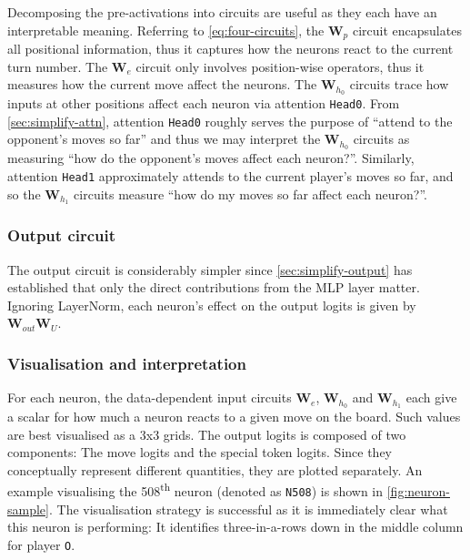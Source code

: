 \documentclass{article}
\newcommand{\m}[1]{\mathbf{\bm{#1}}}
\newcounter{num}
\begin{document}
Decomposing the pre-activations into circuits are useful as they each have an interpretable meaning. Referring to \cref{eq:four-circuits}, the $\m{W}_p$ circuit encapsulates all positional information, thus it captures how the neurons react to the current turn number. The $\m{W}_e$ circuit only involves position-wise operators, thus it measures how the current move affect the neurons. The $\m{W}_{h_0}$ circuits trace how inputs at other positions affect each neuron via attention \texttt{Head0}. From \cref{sec:simplify-attn}, attention \texttt{Head0} roughly serves the purpose of ``attend to the opponent's moves so far'' and thus we may interpret the $\m{W}_{h_0}$ circuits as measuring ``how do the opponent's moves affect each neuron?''. Similarly, attention \texttt{Head1} approximately attends to the current player's moves so far, and so the $\m{W}_{h_1}$ circuits measure ``how do my moves so far affect each neuron?''.

\subsubsection{Output circuit}

The output circuit is considerably simpler since \cref{sec:simplify-output} has established that only the direct contributions from the MLP layer matter. Ignoring LayerNorm, each neuron's effect on the output logits is given by $\m{W}_{out} \m{W}_U$.

\subsubsection{Visualisation and interpretation}



For each neuron, the data-dependent input circuits $\m{W}_e$, $\m{W}_{h_0}$ and $\m{W}_{h_1}$ each give a scalar for how much a neuron reacts to a given move on the board. Such values are best visualised as a 3x3 grids. The output logits is composed of two components: The move logits and the special token logits. Since they conceptually represent different quantities, they are plotted separately. An example visualising the 508\textsuperscript{th} neuron (denoted as \texttt{N508}) is shown in \cref{fig:neuron-sample}. The visualisation strategy is successful as it is immediately clear what this neuron is performing: It identifies three-in-a-rows down in the middle column for player \texttt{O}.


\end{document}
